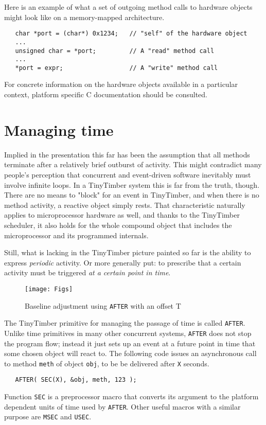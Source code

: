 \documentclass[12pt]{article}
\begin{document}
Here is an example of what a set of outgoing method calls to hardware objects might look like on a memory-mapped architecture.
\begin{verbatim}
   char *port = (char*) 0x1234;   // "self" of the hardware object
   ...
   unsigned char = *port;         // A "read" method call
   ...
   *port = expr;                  // A "write" method call
\end{verbatim}
For concrete information on the hardware objects available in a particular context, platform specific C documentation should be consulted.


\section{Managing time}
\label{sect:time}

Implied in the presentation this far has been the assumption that all methods terminate after a relatively brief outburst of activity.  This might contradict many people's perception that concurrent and event-driven software inevitably must involve infinite loops.  In a TinyTimber system this is far from the truth, though.  There are no means to "block" for an event in TinyTimber, and when there is no method activity, a reactive object simply rests.  That characteristic naturally applies to microprocessor hardware as well, and thanks to the TinyTimber scheduler, it also holds for the whole compound object that includes the microprocessor and its programmed internals.

Still, what is lacking in the TinyTimber picture painted so far is the ability to express {\em periodic} activity.  Or more generally put: to prescribe that a certain activity must be triggered {\em at a certain point in time}.

\begin{figure}
\begin{center}
\texttt{[image: Figs]}
\caption{\label{fig:after}Baseline adjustment using {\tt AFTER} with an offset T}
\end{center}
\end{figure}

The TinyTimber primitive for managing the passage of time is called {\tt AFTER}.  Unlike time primitives in many other concurrent systems, {\tt AFTER} does not stop the program flow; instead it just sets up an event at a future point in time that some chosen object will react to.  The following code issues an asynchronous call to method {\tt meth} of object {\tt obj}, to be be delivered after {\tt X} seconds.
\begin{verbatim}
   AFTER( SEC(X), &obj, meth, 123 );
\end{verbatim}
Function {\tt SEC} is a preprocessor macro that converts its argument to the platform dependent units of time used by {\tt AFTER}.  Other useful macros with a similar purpose are {\tt MSEC} and {\tt USEC}.
\end{document}
